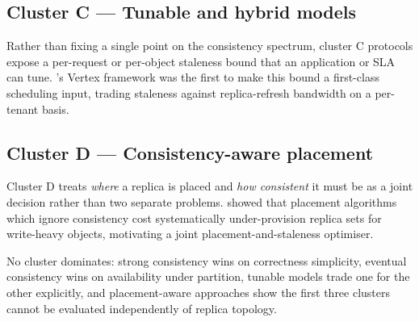 \subsection{Cluster C --- Tunable and hybrid models}

Rather than fixing a single point on the consistency spectrum, cluster C protocols expose a
per-request or per-object staleness bound that an application or SLA can tune. \citet{osei2019vertex}'s
Vertex framework was the first to make this bound a first-class scheduling input, trading staleness
against replica-refresh bandwidth on a per-tenant basis.

\subsection{Cluster D --- Consistency-aware placement}

Cluster D treats \emph{where} a replica is placed and \emph{how consistent} it must be as a joint
decision rather than two separate problems. \citet{alvarez2021nimbus} showed that placement algorithms
which ignore consistency cost systematically under-provision replica sets for write-heavy objects,
motivating a joint placement-and-staleness optimiser.

\begin{keytakeaway}
No cluster dominates: strong consistency wins on correctness simplicity, eventual consistency wins on
availability under partition, tunable models trade one for the other explicitly, and placement-aware
approaches show the first three clusters cannot be evaluated independently of replica topology.
\end{keytakeaway}
